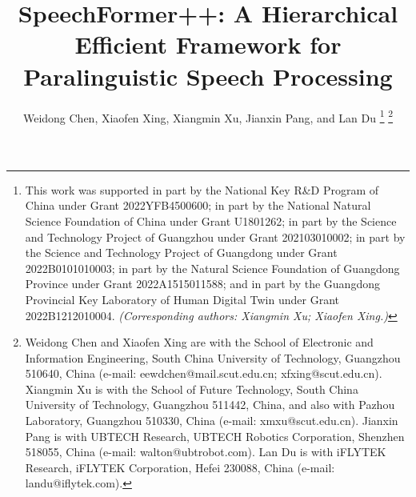 \documentclass[lettersize,journal]{IEEEtran}
\begin{document}
\title{SpeechFormer++: A Hierarchical Efficient Framework for Paralinguistic Speech Processing}
\author{Weidong Chen, Xiaofen Xing, Xiangmin Xu, Jianxin Pang, and Lan Du
\thanks{This work was supported in part by the National Key R\&D Program of China under Grant 2022YFB4500600; in part by the National Natural Science Foundation of China under Grant U1801262; in part by the Science and Technology Project of Guangzhou under Grant 202103010002; in part by the Science and Technology Project of Guangdong under Grant 2022B0101010003; in part by the Natural Science Foundation of Guangdong Province under Grant 2022A1515011588; and in part by the Guangdong Provincial Key Laboratory of Human Digital Twin under Grant 2022B1212010004. \textit{(Corresponding authors: Xiangmin Xu; Xiaofen Xing.)}}
\thanks{Weidong Chen and Xiaofen Xing are with the School of Electronic and Information Engineering, South China University of Technology, Guangzhou 510640, China (e-mail: eewdchen@mail.scut.edu.cn; xfxing@scut.edu.cn). Xiangmin Xu is with the School of Future Technology, South China University of Technology, Guangzhou 511442, China, and also with Pazhou Laboratory, Guangzhou 510330, China (e-mail: xmxu@scut.edu.cn). Jianxin Pang is with UBTECH Research, UBTECH Robotics Corporation, Shenzhen 518055, China (e-mail: walton@ubtrobot.com). Lan Du is with iFLYTEK Research, iFLYTEK Corporation, Hefei 230088, China (e-mail: landu@iflytek.com).}
}


\maketitle
\end{document}
